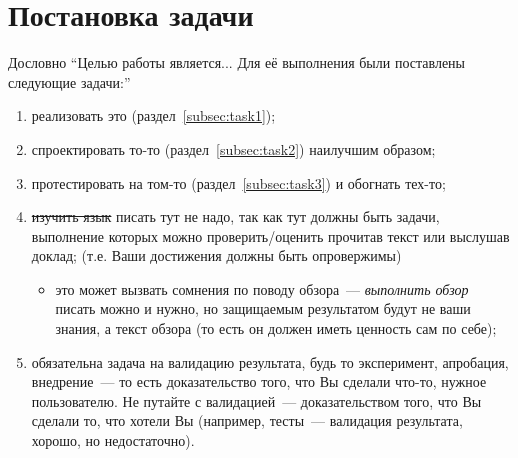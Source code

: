 
\section{Постановка задачи}
\label{sec:task}
Дословно \enquote{Целью работы является... Для её выполнения были постав\-лены следующие задачи:}
\begin{enumerate}
    \item реализовать это (раздел~\ref{subsec:task1});
    \item спроектировать то-то (раздел~\ref{subsec:task2}) наилучшим образом;
    \item протестировать на том-то (раздел~\ref{subsec:task3}) и обогнать тех-то;
    \item \sout{изучить язык \OCaml{}} писать тут не надо, так как тут должны быть задачи, выполнение которых можно проверить/оценить прочитав текст или выслушав доклад;
          (т.е. Ваши достижения должны быть опровержимы)
          \begin{itemize}
              \item это может вызвать сомнения по поводу обзора~--- \emph{выполнить обзор} писать можно и нужно, но защищаемым результатом будут не ваши знания, а текст обзора (то есть он должен иметь ценность сам по себе);
          \end{itemize}
    \item обязательна задача на валидацию результата, будь то эксперимент, апробация, внедрение~--- то есть доказательство того, что Вы сделали что-то, нужное пользователю. Не путайте с валидацией~--- доказательством того, что Вы сделали то, что хотели Вы (например, тесты~--- валидация результата, хорошо, но недостаточно).
\end{enumerate}
